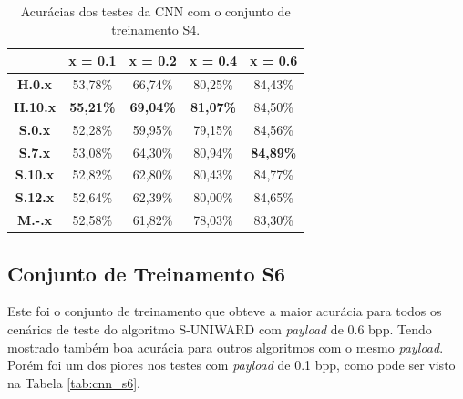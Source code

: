 \begin{table}[!htb]
\centering
\begin{tabular}{c|c|c|c|c|}
\cline{2-5}
\textbf{}                             & \textbf{x = 0.1} & \textbf{x = 0.2} & \textbf{x = 0.4} & \textbf{x = 0.6} \\ \hline
\multicolumn{1}{|c|}{\textbf{H.0.x}}  & 53,78\%          & 66,74\%          & 80,25\%          & 84,43\%          \\ \hline
\multicolumn{1}{|c|}{\textbf{H.10.x}} & \textbf{55,21\%} & \textbf{69,04\%} & \textbf{81,07\%} & 84,50\%          \\ \hline
\multicolumn{1}{|c|}{\textbf{S.0.x}}  & 52,28\%          & 59,95\%          & 79,15\%          & 84,56\%          \\ \hline
\multicolumn{1}{|c|}{\textbf{S.7.x}}  & 53,08\%          & 64,30\%          & 80,94\%          & \textbf{84,89\%} \\ \hline
\multicolumn{1}{|c|}{\textbf{S.10.x}} & 52,82\%          & 62,80\%          & 80,43\%          & 84,77\%          \\ \hline
\multicolumn{1}{|c|}{\textbf{S.12.x}} & 52,64\%          & 62,39\%          & 80,00\%          & 84,65\%          \\ \hline
\multicolumn{1}{|c|}{\textbf{M.-.x}}  & 52,58\%          & 61,82\%          & 78,03\%          & 83,30\%          \\ \hline
\end{tabular}
\caption{Acurácias dos testes da CNN com o conjunto de treinamento S4.}
\label{tab:cnn_s4}
\end{table}


\subsection{Conjunto de Treinamento S6}

Este foi o conjunto de treinamento que obteve a maior acurácia para todos os cenários de teste do algoritmo S-UNIWARD com \textit{payload} de 0.6 bpp. Tendo mostrado também boa acurácia para outros algoritmos com o mesmo \textit{payload}. Porém foi um dos piores nos testes com \textit{payload} de 0.1 bpp, como pode ser visto na Tabela \ref{tab:cnn_s6}.

